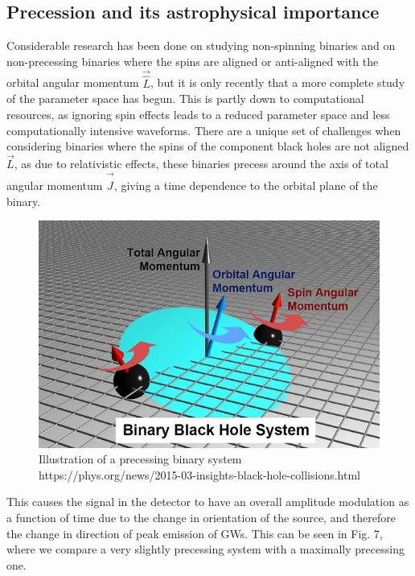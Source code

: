 \documentclass[11pt]{article}
\begin{document}
\subsection{Precession and its astrophysical importance}
Considerable research has been done on studying non-spinning binaries and on non-precessing binaries where the spins are aligned or anti-aligned with the orbital angular momentum $\vec{\hat{L}}$\cite{pe3}, but it is only recently that a more complete study of the parameter space has begun\cite{sloos}\cite{pe_latest}. This is partly down to computational resources, as ignoring spin effects leads to a reduced parameter space and less computationally intensive waveforms. There are a unique set of challenges when considering binaries where the spins of the component black holes are not aligned $\vec{L}$, as due to relativistic effects, these binaries precess around the axis of total angular momentum $\vec{\hat{J}}$, giving a time dependence to the orbital plane of the binary\cite{precess1}\cite{precess2}.
\begin{figure}
	\includegraphics[scale=0.75]{fig6.jpg}
	\centering
	\caption{Illustration of a precessing binary system https://phys.org/news/2015-03-insights-black-hole-collisions.html}
	\centering
\end{figure}
This causes the signal in the detector to have an overall amplitude modulation as a function of time due to the change in orientation of the source, and therefore the change in direction of peak emission of GWs. This can be seen in Fig. 7, where we compare a very slightly precessing system with a maximally precessing one.
\end{document}
